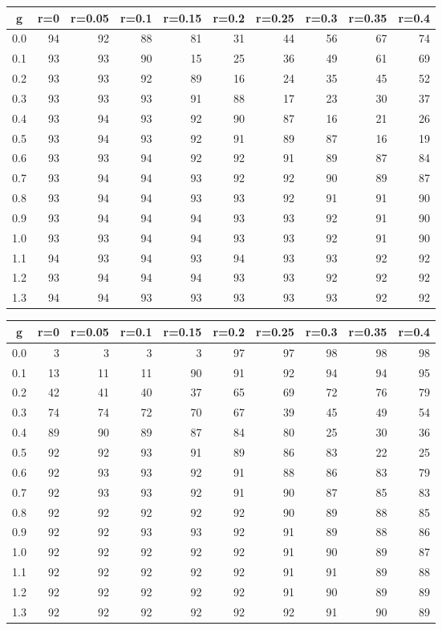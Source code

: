 %
\begin{table}[!tbp]
 \begin{center}
 \begin{tabular}{rrrrrrrrrr}\hline\hline
\multicolumn{1}{c}{g}&\multicolumn{1}{c}{r=0}&\multicolumn{1}{c}{r=0.05}&\multicolumn{1}{c}{r=0.1}&\multicolumn{1}{c}{r=0.15}&\multicolumn{1}{c}{r=0.2}&\multicolumn{1}{c}{r=0.25}&\multicolumn{1}{c}{r=0.3}&\multicolumn{1}{c}{r=0.35}&\multicolumn{1}{c}{r=0.4}\tabularnewline
\hline
0.0&94&92&88&81&31&44&56&67&74\tabularnewline
0.1&93&93&90&15&25&36&49&61&69\tabularnewline
0.2&93&93&92&89&16&24&35&45&52\tabularnewline
0.3&93&93&93&91&88&17&23&30&37\tabularnewline
0.4&93&94&93&92&90&87&16&21&26\tabularnewline
0.5&93&94&93&92&91&89&87&16&19\tabularnewline
0.6&93&93&94&92&92&91&89&87&84\tabularnewline
0.7&93&94&94&93&92&92&90&89&87\tabularnewline
0.8&93&94&94&93&93&92&91&91&90\tabularnewline
0.9&93&94&94&94&93&93&92&91&90\tabularnewline
1.0&93&93&94&94&93&93&92&91&90\tabularnewline
1.1&94&93&94&93&94&93&93&92&92\tabularnewline
1.2&93&94&94&94&93&93&92&92&92\tabularnewline
1.3&94&94&93&93&93&93&93&92&92\tabularnewline
\hline
\end{tabular}

\end{center}

\end{table}

%
\begin{table}[!tbp]
 \begin{center}
 \begin{tabular}{rrrrrrrrrr}\hline\hline
\multicolumn{1}{c}{g}&\multicolumn{1}{c}{r=0}&\multicolumn{1}{c}{r=0.05}&\multicolumn{1}{c}{r=0.1}&\multicolumn{1}{c}{r=0.15}&\multicolumn{1}{c}{r=0.2}&\multicolumn{1}{c}{r=0.25}&\multicolumn{1}{c}{r=0.3}&\multicolumn{1}{c}{r=0.35}&\multicolumn{1}{c}{r=0.4}\tabularnewline
\hline
0.0& 3& 3& 3& 3&97&97&98&98&98\tabularnewline
0.1&13&11&11&90&91&92&94&94&95\tabularnewline
0.2&42&41&40&37&65&69&72&76&79\tabularnewline
0.3&74&74&72&70&67&39&45&49&54\tabularnewline
0.4&89&90&89&87&84&80&25&30&36\tabularnewline
0.5&92&92&93&91&89&86&83&22&25\tabularnewline
0.6&92&93&93&92&91&88&86&83&79\tabularnewline
0.7&92&93&93&92&91&90&87&85&83\tabularnewline
0.8&92&92&92&92&92&90&89&88&85\tabularnewline
0.9&92&92&93&93&92&91&89&88&86\tabularnewline
1.0&92&92&92&92&92&91&90&89&87\tabularnewline
1.1&92&92&92&92&92&91&91&89&88\tabularnewline
1.2&92&92&92&92&92&91&90&89&89\tabularnewline
1.3&92&92&92&92&92&92&91&90&89\tabularnewline
\hline
\end{tabular}

\end{center}

\end{table}

